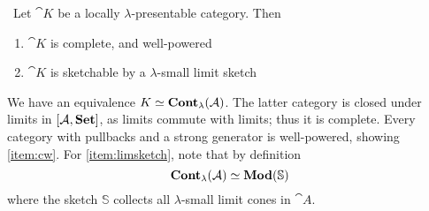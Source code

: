 \begin{Corollary}\
Let $\cat K$ be a locally $\lambda$-presentable category. Then
\begin{enumerate}
\item $\cat K$ is complete, and well-powered \label{item:cw}
\item $\cat K$ is sketchable by a $\lambda$-small limit sketch \label{item:limsketch}
\end{enumerate}
\end{Corollary}
\begin{Proof}
We have an equivalence $K \simeq \mathbf{Cont}_\lambda(\mathcal{A})$. The latter category is closed under limits in $[\mathcal{A},\mathbf{Set}]$, as limits commute with limits; thus it is complete. Every category with pullbacks and a strong generator is well-powered, showing \ref{item:cw}. For \ref{item:limsketch}, note that by definition
\[ \mathbf{Cont}_\lambda(\mathcal{A}) \simeq \mathbf{Mod}(\mathbb S) \]
where the sketch $\mathbb S$ collects all $\lambda$-small limit cones in $\cat A$.
\end{Proof}